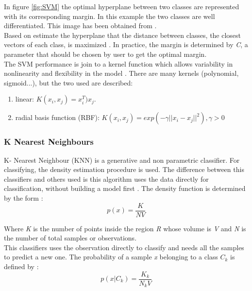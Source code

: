 In figure \ref{fig:SVM} the optimal hyperplane between two classes are represented with its corresponding margin. In this example the two classes are well differentiated. This image has been obtained from \cite{SVMimage}.\\

Based on estimate the hyperplane that the distance between classes, the closest vectors of each class, is maximized \cite{SVM1, MachineLearning}. In practice, the margin is determined by \textit{C}, a parameter that should be chosen by user to get the optimal margin.\\

The SVM performance is join to a kernel function which allows variability in nonlinearity and flexibility in the model \cite{ClassifiersReview, practicalguideSVM}. There are many kernels (polynomial, sigmoid...), but the two used are described:

\begin{enumerate}
\item linear: $ K(x_{i},x_{j}) = x_i^T)x_j$.
\item radial basis function (RBF): $K(x_{i},x_{j}) = exp(-\gamma||x_i-x_j||^2), \gamma>0$ 
\end{enumerate}
 

\subsubsection{K Nearest Neighbours}
K- Nearest Neighbour (KNN) is a generative and non parametric classifier. For classifying, the density estimation procedure is used. The difference between this classifiers and others used is this algorithm uses the data directly for classification, without building a model first \cite{ClassifiersReview}. The density function is determined by the form \cite{MachineLearning}:
\begin{equation}
p(x) = \frac{K}{N V}
\end{equation}

Where \textit{K} is the number of points inside the region \textit{R} whose volume is \textit{V} and \textit{N} is the number of total samples or observations.\\

This classifiers uses the observation directly to classify and needs all the samples to predict a new one. The probability of a sample \textit{x} belonging to a class \textit{$C_k$} is defined by \cite{MachineLearning}:
\begin{equation}
p(x|C_k) = \frac{K_k}{N_k V}
\end{equation}

